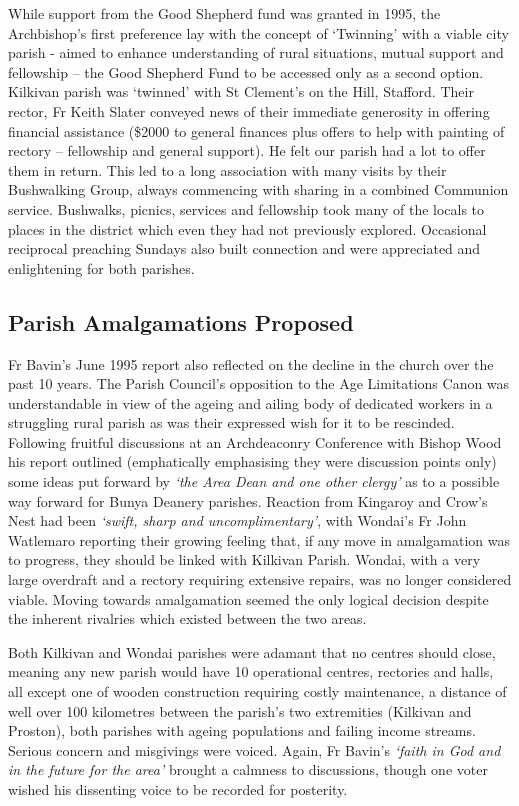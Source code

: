 While support from the Good Shepherd fund was granted in 1995, the Archbishop's first preference lay with the concept of `Twinning' with a viable city parish - aimed to enhance understanding of rural situations, mutual support and fellowship -- the Good Shepherd Fund to be accessed only as a second option. Kilkivan parish was `twinned' with St Clement's on the Hill, Stafford. Their rector, Fr Keith Slater conveyed news of their immediate generosity in offering financial assistance (\$2000 to general finances plus offers to help with painting of rectory -- fellowship and general support). He felt our parish had a lot to offer them in return. This led to a long association with many visits by their Bushwalking Group, always commencing with sharing in a combined Communion service. Bushwalks, picnics, services and fellowship took many of the locals to places in the district which even they had not previously explored. Occasional reciprocal preaching Sundays also built connection and were appreciated and enlightening for both parishes.



\subsection{Parish Amalgamations Proposed}



Fr Bavin's June 1995 report also reflected on the decline in the church over the past 10 years. The Parish Council's opposition to the Age Limitations Canon was understandable in view of the ageing and ailing body of dedicated workers in a struggling rural parish as was their expressed wish for it to be rescinded. Following fruitful discussions at an Archdeaconry Conference with Bishop Wood his report outlined (emphatically emphasising they were discussion points only) some ideas put forward by \emph{`the Area Dean and one other clergy'} as to a possible way forward for Bunya Deanery parishes. Reaction from Kingaroy and Crow's Nest had been \emph{`swift, sharp and uncomplimentary'}, with Wondai's Fr John Watlemaro reporting their growing feeling that, if any move in amalgamation was to progress, they should be linked with Kilkivan Parish. Wondai, with a very large overdraft and a rectory requiring extensive repairs, was no longer considered viable. Moving towards amalgamation seemed the only logical decision despite the inherent rivalries which existed between the two areas.



Both Kilkivan and Wondai parishes were adamant that no centres should close, meaning any new parish would have 10 operational centres, rectories and halls, all except one of wooden construction requiring costly maintenance, a distance of well over 100 kilometres between the parish's two extremities (Kilkivan and Proston), both parishes with ageing populations and failing income streams. Serious concern and misgivings were voiced. Again, Fr Bavin's \emph{`faith in God and in the future for the area'} brought a calmness to discussions, though one voter wished his dissenting voice to be recorded for posterity.



